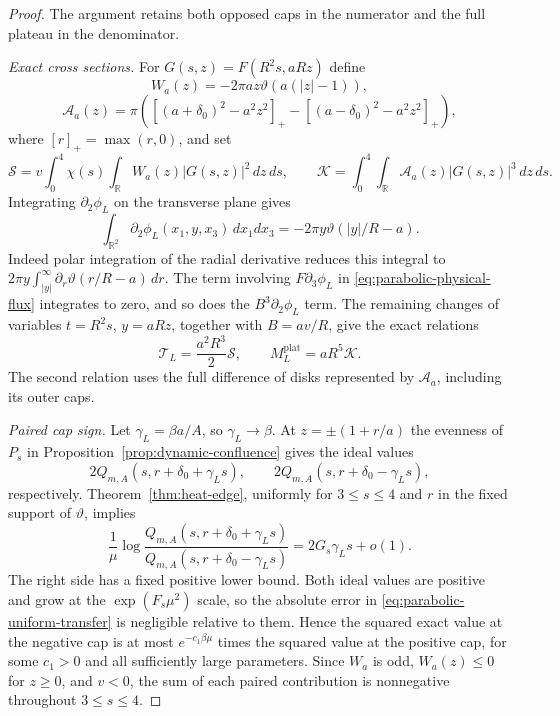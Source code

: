 \begin{proof}
The argument retains both opposed caps in the numerator and the full
plateau in the denominator.

\emph{Exact cross sections.}
For $G(s,z)=F(R^2s,aRz)$ define
\[
 W_a(z)=-2\pi az\vartheta(a(|z|-1)),
\]
\[
 \mathcal A_a(z)=\pi\left(
  [(a+\delta_0)^2-a^2z^2]_+
  -[(a-\delta_0)^2-a^2z^2]_+\right),
\]
where $[r]_+=\max(r,0)$, and set
\[
 \mathcal S=v\int_0^4\chi(s)\int_{\mathbb R}
                  W_a(z)|G(s,z)|^2\,dz\,ds,
 \qquad
 \mathcal K=\int_0^4\int_{\mathbb R}
                  \mathcal A_a(z)|G(s,z)|^3\,dz\,ds.
\]
Integrating $\partial_2\phi_L$ on the transverse plane gives
\[
 \int_{\mathbb R^2}\partial_2\phi_L(x_1,y,x_3)\,dx_1dx_3
   =-2\pi y\vartheta(|y|/R-a).
\]
Indeed polar integration of the radial derivative reduces this integral
to $2\pi y\int_{|y|}^\infty\partial_r
\vartheta(r/R-a)\,dr$.  The term involving $F\partial_3\phi_L$ in
\eqref{eq:parabolic-physical-flux} integrates to zero, and so does the
$B^3\partial_2\phi_L$ term.  The remaining changes of variables
$t=R^2s$, $y=aRz$, together with $B=av/R$, give the exact relations
\begin{equation}\label{eq:parabolic-dimensional-identities}
 \mathcal T_L=\frac{a^2R^3}{2}\mathcal S,
 \qquad M_L^{\mathrm{plat}}=aR^5\mathcal K.
\end{equation}
The second relation uses the full difference of disks represented by
$\mathcal A_a$, including its outer caps.

\emph{Paired cap sign.}
Let $\gamma_L=\beta a/A$, so $\gamma_L\to\beta$.  At
$z=\pm(1+r/a)$ the evenness of $P_s$ in
Proposition~\ref{prop:dynamic-confluence} gives the ideal values
\[
 2Q_{m,A}(s,r+\delta_0+\gamma_Ls),\qquad
 2Q_{m,A}(s,r+\delta_0-\gamma_Ls),
\]
respectively.  Theorem~\ref{thm:heat-edge}, uniformly for
$3\le s\le4$ and $r$ in the fixed support of $\vartheta$, implies
\[
 \frac1\mu\log
 \frac{Q_{m,A}(s,r+\delta_0+\gamma_Ls)}
      {Q_{m,A}(s,r+\delta_0-\gamma_Ls)}
   =2G_s\gamma_Ls+o(1).
\]
The right side has a fixed positive lower bound.  Both ideal values
are positive and grow at the $\exp(F_s\mu^2)$ scale, so the absolute
error in \eqref{eq:parabolic-uniform-transfer} is negligible relative
to them.  Hence the squared exact value at the negative cap is at most
$e^{-c_1\beta\mu}$ times the squared value at the positive cap, for
some $c_1>0$ and all sufficiently large parameters.
Since $W_a$ is odd, $W_a(z)\le0$ for $z\ge0$, and $v<0$, the sum of
each paired contribution is nonnegative throughout $3\le s\le4$.


\end{proof}

